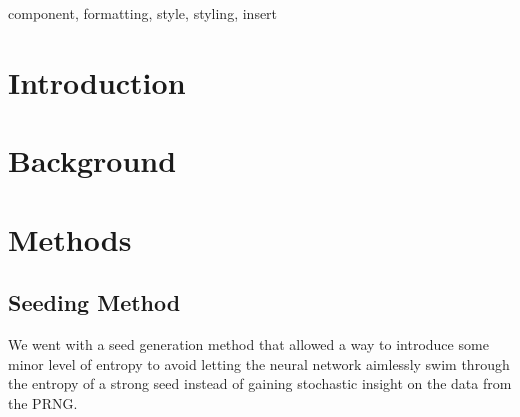 \documentclass[conference]{IEEEtran}
\begin{document}
\begin{abstract}
This document is a model and instructions for \LaTeX.
This and the IEEEtran.cls file define the components of your paper [title, text, heads, etc.]. *CRITICAL: Do Not Use Symbols, Special Characters, Footnotes, 
or Math in Paper Title or Abstract.
This document is a model and instructions for \LaTeX.
This and the IEEEtran.cls file define the components of your paper [title, text, heads, etc.]. *CRITICAL: Do Not Use Symbols, Special Characters, Footnotes, 
or Math in Paper Title or Abstract.
This document is a model and instructions for \LaTeX.
This and the IEEEtran.cls file define the components of your paper [title, text, heads, etc.]. *CRITICAL: Do Not Use Symbols, Special Characters, Footnotes, 
or Math in Paper Title or Abstract.
This document is a model and instructions for \LaTeX.
This and the IEEEtran.cls file define the components of your paper [title, text, heads, etc.]. *CRITICAL: Do Not Use Symbols, Special Characters, Footnotes, 
or Math in Paper Title or Abstract.

\end{abstract}



\begin{IEEEkeywords}
component, formatting, style, styling, insert
\end{IEEEkeywords}

\section{Introduction}


\section{Background}


\section{Methods}
\subsection{Seeding Method}
We went with a seed generation method that allowed a way to introduce some minor level of entropy to avoid letting the neural network aimlessly swim through the entropy of a strong seed instead of gaining stochastic insight on the data from the PRNG.
\end{document}
